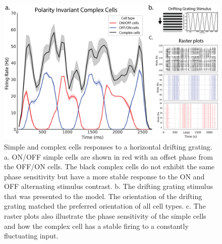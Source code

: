 \documentclass[12pt]{article}
\begin{document}

\begin{figure}[H]
    \centering
    \includegraphics[width=1 \textwidth]{figures/complex_invariance_figure.png}
    \caption{Simple and complex cells responses to a horizontal drifting grating. a. ON/OFF simple cells are shown in red with an offset phase from the OFF/ON cells. The black complex cells do not exhibit the same phase sensitivity but have a more stable response to the ON and OFF alternating stimulus contrast. b. The drifting grating stimulus that was presented to the model. The orientation of the drifting grating matched the preferred orientation of all cell types. c. The raster plots also illustrate the phase sensitivity of the simple cells and how the complex cell has a stable firing to a constantly fluctuating input.}
    \label{fig:polarity invariance}
\end{figure}
\end{document}
